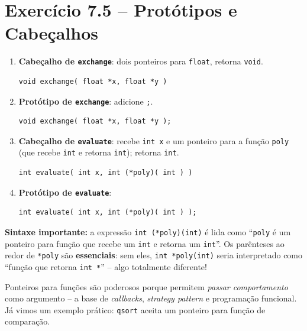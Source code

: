 \documentclass[12pt,a4paper]{article}
\begin{document}
\newpage

\section{Exercício 7.5 -- Protótipos e Cabeçalhos}

\begin{respostabox}
\begin{enumerate}[label=\textbf{\alph*)}]

\item \textbf{Cabeçalho de \texttt{exchange}}: dois ponteiros para \texttt{float}, retorna \texttt{void}.
\begin{lstlisting}
void exchange( float *x, float *y )
\end{lstlisting}

\item \textbf{Protótipo de \texttt{exchange}}: adicione \texttt{;}.
\begin{lstlisting}
void exchange( float *x, float *y );
\end{lstlisting}

\item \textbf{Cabeçalho de \texttt{evaluate}}: recebe \texttt{int x} e um ponteiro
para a função \texttt{poly} (que recebe \texttt{int} e retorna \texttt{int}); retorna \texttt{int}.
\begin{lstlisting}
int evaluate( int x, int (*poly)( int ) )
\end{lstlisting}

\item \textbf{Protótipo de \texttt{evaluate}}:
\begin{lstlisting}
int evaluate( int x, int (*poly)( int ) );
\end{lstlisting}

\end{enumerate}

\textbf{Sintaxe importante:} a expressão \texttt{int (*poly)(int)} é lida como
``\texttt{poly} é um ponteiro para função que recebe um \texttt{int} e retorna
um \texttt{int}''. Os parênteses ao redor de \texttt{*poly} são \textbf{essenciais}:
sem eles, \texttt{int *poly(int)} seria interpretado como ``função que retorna
\texttt{int *}'' -- algo totalmente diferente!

\begin{boaprática}
  Ponteiros para funções são poderosos porque permitem \textit{passar comportamento}
  como argumento -- a base de \textit{callbacks}, \textit{strategy pattern} e
  programação funcional. Já vimos um exemplo prático: \texttt{qsort} aceita um
  ponteiro para função de comparação.
\end{boaprática}
\end{respostabox}
\end{document}

